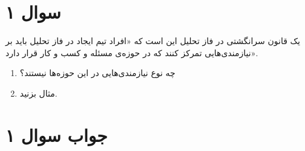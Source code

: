 \section*{سوال ۱}

یک قانون سرانگشتی در فاز تحلیل این است که «افراد تیم ایجاد در فاز تحلیل باید بر نیازمندی‌هایی تمرکز کنند که در حوزه‌ی مسئله و کسب و کار قرار دارد».
\begin{enumerate}
	\item چه نوع نیازمندی‌هایی در این حوزه‌ها نیستند؟
	\item مثال بزنید.
\end{enumerate}

\section*{جواب سوال ۱}

